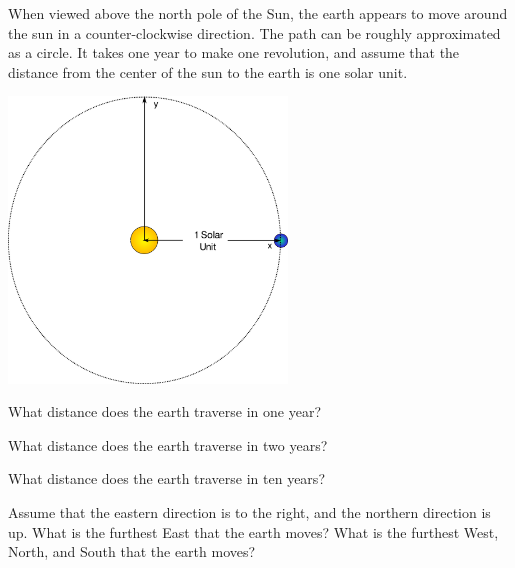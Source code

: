
\begin{problem}
\item When viewed above the north pole of the Sun, the earth appears
  to move around the sun in a counter-clockwise direction. The path
  can be roughly approximated as a circle. It takes
  one year to make one revolution, and assume that the distance from
  the center of the sun to the earth is one solar unit.

  \begin{center}
    \includegraphics[width=20em]{angles/img/simpleSolarSystem}
  \end{center}

  \begin{subproblem}
  \item What distance does the earth traverse in one year?
    \vfill
  \item What distance does the earth traverse in two years?
    \vfill
  \item What distance does the earth traverse in ten years?
    \vfill
  \item Assume that the eastern direction is to the right, and the
    northern direction is up. What is the furthest East that the earth
    moves? What is the furthest West, North, and South that the earth
    moves?
    \vfill
  \end{subproblem}

\end{problem}


